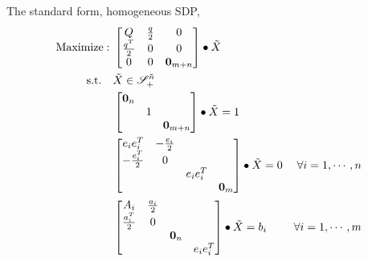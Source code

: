 \documentclass[../main]{subfiles}
\begin{document}
The standard form, homogeneous SDP,
\begin{equation}
    \begin{aligned}
        \mathrm{Maximize:\;}            & \begin{bmatrix}
            Q & \frac{q}{2} & 0 \\ \frac{q^T}{2} & 0 & 0 \\ 0 & 0 & \bm 0_{m+n}
        \end{bmatrix} \bullet \tilde X                               \\
        \mathrm{s.t.} \quad & \tilde{X}  \in \mathscr S^{\tilde{n}}_+                                   \\
                            & \begin{bmatrix}  \bm 0_n &  &  \\  & 1 &  \\  & & \bm 0_{m+n} \end{bmatrix} \bullet \tilde X = 1                           \\
                            & \begin{bmatrix}
            e_ie_i^T         & -\frac{e_i}{2} &          &         \\
            -\frac{e_i^T}{2} & 0              &          &         \\
                             &                & e_ie_i^T &         \\
                             &                &          & \bm 0_m
        \end{bmatrix} \bullet \tilde X = 0   & \forall i=1,\cdots, n \\
                            & \begin{bmatrix}
            A_i             & \frac{a_i}{2} &         &          \\
            \frac{a_i^T}{2} & 0             &         &          \\
                            &               & \bm 0_n &          \\
                            &               &         & e_ie_i^T
        \end{bmatrix}\bullet \tilde{X} = b_i & \forall i=1,\cdots, m \\
    \end{aligned}
\end{equation}
\end{document}
